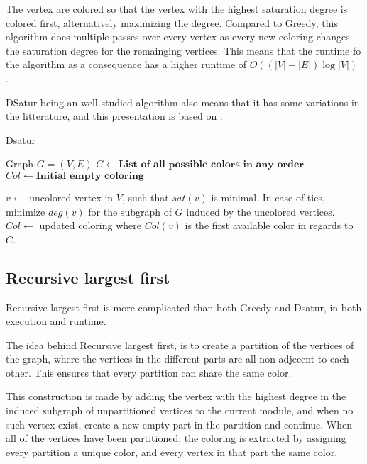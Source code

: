 \documentclass{amsart}
\begin{document}
The vertex are colored so that the vertex with the highest saturation degree is
colored first, alternatively maximizing the degree. Compared to Greedy, this
algorithm does multiple passes over every vertex as every new coloring changes
the saturation degree for the remainging vertices. This means that the runtime
fo  the algorithm as a consequence has a higher runtime of
$O((|V|+|E|)\log{|V|})$ \cite{Constructive}.

DSatur being an well studied algorithm also means that it has some variations in 
the litterature, and this presentation is based on \cite{Constructive}.

\begin{algorithm}[H]
  \caption{Dsatur}
  \begin{algorithmic}[1]
      \REQUIRE Graph $G = (V,E)$
      \STATE $C \leftarrow \textbf{List of all possible colors in any order}$
      \STATE $Col \leftarrow \textbf{Initial empty coloring}$


        \STATE $v \leftarrow$ uncolored vertex in $V$, such that $sat(v)$ is
        minimal. In case of ties, minimize $deg(v)$ for the subgraph of $G$
        induced by the uncolored vertices.
        \STATE $Col \leftarrow$ updated coloring where $Col(v)$ is the first
        available color in regards to $C$.
      \ENDFOR
  \end{algorithmic}
\end{algorithm}

\subsection{Recursive largest first}

Recursive largest first is more complicated than both Greedy and Dsatur, in both
execution and runtime. 

The idea behind Recursive largest first, is to create a partition of the
vertices of the graph, where the vertices in the different parts are all
non-adjecent to each other. This ensures that every partition can share the
same color. 

This construction is made by adding the vertex with the highest degree in the
induced subgraph of unpartitioned vertices to the current module, and when no
such vertex exist, create a new empty part in the partition and continue. When
all of the vertices have been partitioned, the coloring is extracted by
assigning every partition a unique color, and every vertex in that part the same
color.
\end{document}
